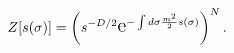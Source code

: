 \begin{equation}
   Z[s(\sigma)]=\left(s^{-D/2}\text{\Large e}^{-\int d\sigma
   \frac{m^2}{2}s(\sigma)}\right)^N.
   \label{32}
   \end{equation}

